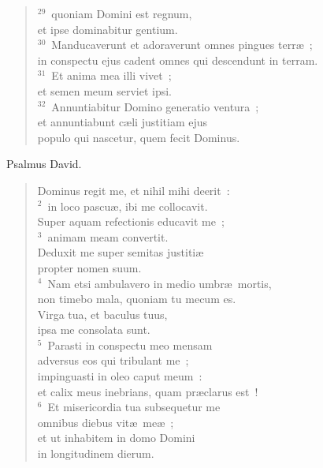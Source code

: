 \begin{flushleft}
\begin{verse}
${}^{29}$~quoniam Domini est regnum,\\ et ipse dominabitur gentium.\\
${}^{30}$~Manducaverunt et adoraverunt omnes pingues terr\ae~;\\ in conspectu ejus cadent omnes qui descendunt in terram.\\
${}^{31}$~Et anima mea illi vivet~;\\ et semen meum serviet ipsi.\\
${}^{32}$~Annuntiabitur Domino generatio ventura~;\\ et annuntiabunt c\ae li justitiam ejus\\ populo qui nascetur, quem fecit Dominus.\end{verse}\end{flushleft}



\bchapter
\lettrine[lines=3,image=true,loversize=0.05,lraise=-0.03]{P}{}salmus David. \begin{flushleft}\begin{verse}\vspace{6pt}Dominus regit me, et nihil mihi deerit~:\\
${}^{2}$~in loco pascu\ae , ibi me collocavit.\\ Super aquam refectionis educavit me~;\\
${}^{3}$~animam meam convertit.\\ Deduxit me super semitas justiti\ae \\ propter nomen suum.\\
${}^{4}$~Nam etsi ambulavero in medio umbr\ae\ mortis,\\ non timebo mala, quoniam tu mecum es.\\ Virga tua, et baculus tuus,\\ ipsa me consolata sunt.\\
${}^{5}$~Parasti in conspectu meo mensam\\ adversus eos qui tribulant me~;\\ impinguasti in oleo caput meum~:\\ et calix meus inebrians, quam pr\ae clarus est~!\\
${}^{6}$~Et misericordia tua subsequetur me\\ omnibus diebus vit\ae\ me\ae~;\\ et ut inhabitem in domo Domini\\ in longitudinem dierum.\end{verse}\end{flushleft}




